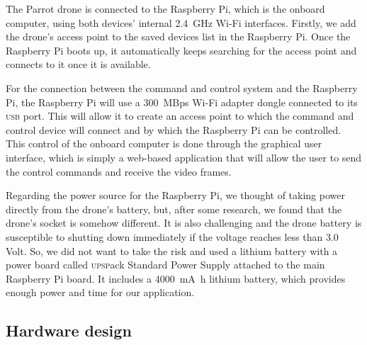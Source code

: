 \documentclass[../main.tex]{subfiles}
\begin{document}
The Parrot \anafi drone is connected 
to the Raspberry Pi, which is the onboard computer,
using both devices' internal 
\SI{2.4}{\giga\hertz}
Wi-Fi interfaces. 
Firstly, we add the \anafi drone's access point 
to the saved devices list in the Raspberry Pi.
Once the Raspberry Pi boots up, it automatically keeps 
searching for the access point and connects 
to it once it is available.

For the connection between the command and control system 
and the Raspberry Pi, 
the Raspberry Pi will use a 
\SI[per-mode=symbol,per-symbol=p]{300}{MBps} 
Wi-Fi adapter dongle connected to 
its \textsc{usb} port. 
This will allow it to create an access point to which 
the command and control device will connect and by which 
the Raspberry Pi can be controlled. This control of the 
onboard computer is done through the graphical user interface,
which is simply a web-based application 
that will allow the user to send the
control commands and receive the video frames. 


Regarding the power source for the Raspberry Pi, 
we thought of taking power directly from the 
drone's battery, but, after some research, we found 
that the \anafi drone's  
socket is somehow different. It is also challenging 
and the drone battery is susceptible to shutting down 
immediately if the voltage reaches less than 3.0 Volt. 
So, we did not want to take the risk and used a 
lithium battery with a power board called 
\textsc{upsp}ack Standard Power Supply attached to 
the main Raspberry Pi board. It includes a 
\SI{4000}{\milli\ampere\hour}
lithium battery, which provides enough power 
and time for our application.

\subsection{Hardware design}
\end{document}
